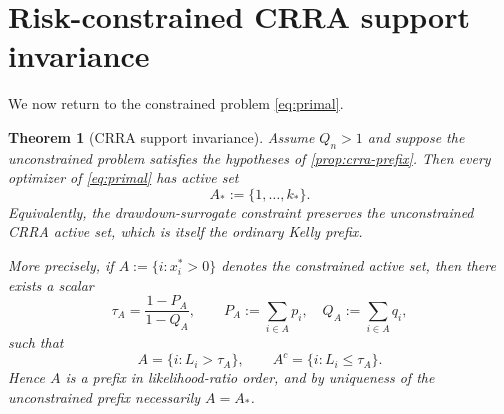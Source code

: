\documentclass[11pt]{article}
\newtheorem{theorem}{Theorem}[section]
\theoremstyle{definition}
\theoremstyle{remark}
\newcommand{\1}{\mathbf{1}}
\begin{document}
\section{Risk-constrained CRRA support invariance}
\label{sec:constrained-crra}

We now return to the constrained problem \eqref{eq:primal}.

\begin{theorem}[CRRA support invariance]
\label{thm:support}
Assume $Q_n>1$ and suppose the unconstrained problem satisfies the hypotheses of \cref{prop:crra-prefix}. Then every optimizer of \eqref{eq:primal} has active set
\[
A_*:=\{1,\dots,k_*\}.
\]
Equivalently, the drawdown-surrogate constraint preserves the unconstrained CRRA active set, which is itself the ordinary Kelly prefix.

More precisely, if $A:=\{i:x_i^*>0\}$ denotes the constrained active set, then there exists a scalar
\[
\tau_A=\frac{1-P_A}{1-Q_A},
\qquad
P_A:=\sum_{i\in A}p_i,
\quad
Q_A:=\sum_{i\in A}q_i,
\]
such that
\[
A=\{i:L_i>\tau_A\},
\qquad
A^c=\{i:L_i\le \tau_A\}.
\]
Hence $A$ is a prefix in likelihood-ratio order, and by uniqueness of the unconstrained prefix necessarily $A=A_*$.
\end{theorem}
\end{document}
